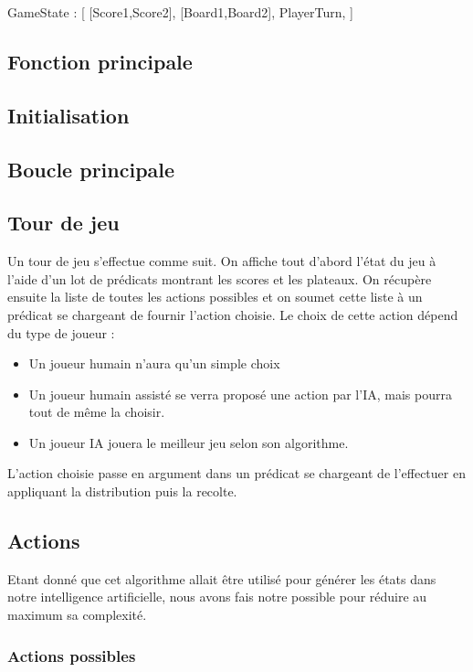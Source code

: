 \documentclass[]{article}
\begin{document}
GameState :
[
	[Score1,Score2],
	[Board1,Board2],
	PlayerTurn, 
]

\subsection{Fonction principale}



\subsection{Initialisation}

\subsection{Boucle principale}

\subsection{Tour de jeu}

Un tour de jeu s'effectue comme suit. On affiche tout d'abord l'état du jeu à l'aide d'un lot de prédicats montrant les scores et les plateaux. On récupère ensuite la liste de toutes les actions possibles et on soumet cette liste à un prédicat se chargeant de fournir l'action choisie. Le choix de cette action dépend du type de joueur : 
\begin{itemize}
\item Un joueur humain n'aura qu'un simple choix
\item Un joueur humain assisté se verra proposé une action par l'IA, mais pourra tout de même la choisir.
\item Un joueur IA jouera le meilleur jeu selon son algorithme.
\end{itemize}

L'action choisie passe en argument dans un prédicat se chargeant de l'effectuer en appliquant la distribution puis la recolte.

\subsection{Actions}

Etant donné que cet algorithme allait être utilisé pour générer les états dans notre intelligence artificielle, nous avons fais notre possible pour réduire au maximum sa complexité.

\subsubsection{Actions possibles}
\end{document}
